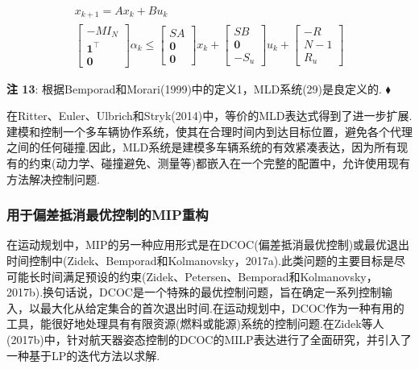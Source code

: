 \documentclass[10pt]{article}
\begin{document}
\begin{subequations}
\begin{gather}
{x}_{k + 1} = A{x}_{k} + B{u}_{k} \\
\left\lbrack  \begin{matrix}  - M{I}_{N} \\  {\mathbf{1}}^{\top } \\  \mathbf{0} \end{matrix}\right\rbrack  {\alpha }_{k} \leq  \left\lbrack  \begin{matrix} {SA} \\  \mathbf{0} \\  \mathbf{0} \end{matrix}\right\rbrack  {x}_{k} + \left\lbrack  \begin{matrix} {SB} \\  \mathbf{0} \\   - {S}_{u} \end{matrix}\right\rbrack  {u}_{k} + \left\lbrack  \begin{matrix}  - R \\  N - 1 \\  {R}_{u} \end{matrix}\right\rbrack
\end{gather}
\end{subequations}


\vspace{1 em}
\noindent\textbf{注 13}: 根据Bemporad和Morari(1999)中的定义1，MLD系统(29)是良定义的. \(\blacklozenge\)
\vspace{1 em}

在Ritter、Euler、Ulbrich和Stryk(2014)中，等价的MLD表达式得到了进一步扩展.建模和控制一个多车辆协作系统，使其在合理时间内到达目标位置，避免各个代理之间的任何碰撞.因此，MLD系统是建模多车辆系统的有效紧凑表达，因为所有现有的约束(动力学、碰撞避免、测量等)都嵌入在一个完整的配置中，允许使用现有方法解决控制问题.

\subsubsection*{用于偏差抵消最优控制的MIP重构}

在运动规划中，MIP的另一种应用形式是在DCOC(偏差抵消最优控制)或最优退出时间控制中(Zidek、Bemporad和Kolmanovsky，2017a).此类问题的主要目标是尽可能长时间满足预设的约束(Zidek、Petersen、Bemporad和Kolmanovsky，2017b).换句话说，DCOC是一个特殊的最优控制问题，旨在确定一系列控制输入，以最大化从给定集合的首次退出时间.在运动规划中，DCOC作为一种有用的工具，能很好地处理具有有限资源(燃料或能源)系统的控制问题.在Zidek等人(2017b)中，针对航天器姿态控制的DCOC的MILP表达进行了全面研究，并引入了一种基于LP的迭代方法以求解.
\end{document}
